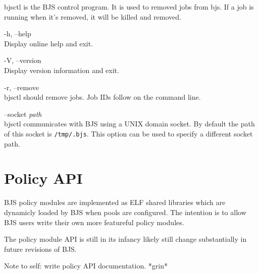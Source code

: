 \documentclass[oneside]{book}
\begin{document}
bjsctl is the BJS control program.  It is used to removed jobs from
bjs.  If a job is running when it's removed, it will be killed and
removed.

\begin{description}

\item{-h, --help}\\
  Display online help and exit.

\item{-V, --version}\\
  Display version information and exit.

\item{-r, --remove}\\
  bjsctl should remove jobs.  Job IDs follow on the command line.

\item{--socket \textit{path}}\\
  bjsctl communicates with BJS using a UNIX domain socket.  By default
  the path of this socket is \texttt{/tmp/.bjs}.  This option can be
  used to specify a different socket path.
\end{description}




\part{Policy API}

BJS policy modules are implemented as ELF shared libraries which are
dynamicly loaded by BJS when pools are configured.  The intention is
to allow BJS users write their own more featureful policy modules.

The policy module API is still in its infancy likely still change
substantially in future revisions of BJS.


Note to self: write policy API documentation.  *grin*


\printindex
\end{document}
